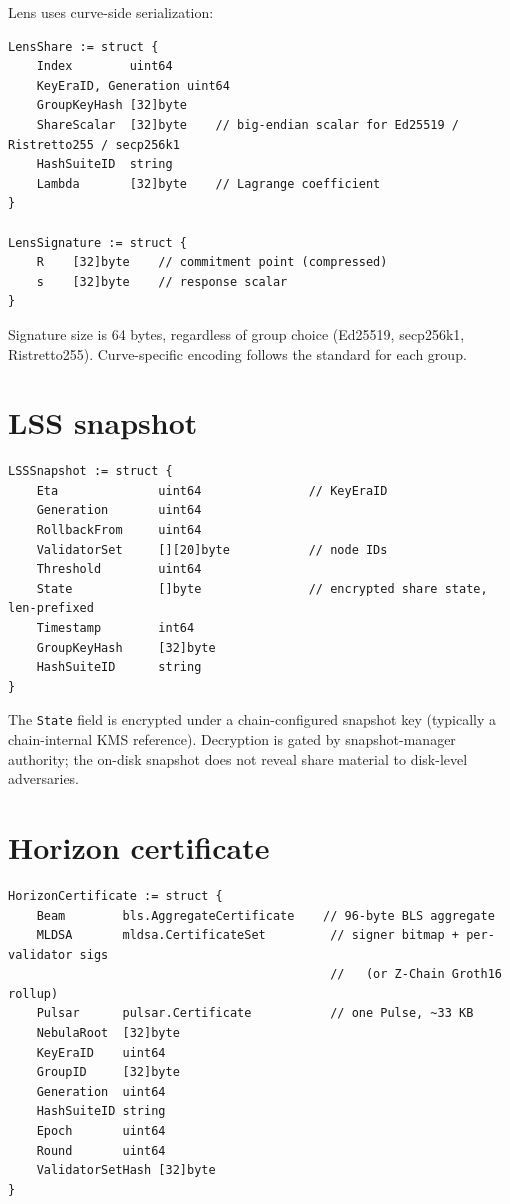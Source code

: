 \documentclass[11pt,a4paper]{article}
\begin{document}
Lens uses curve-side serialization:

\begin{lstlisting}
LensShare := struct {
    Index        uint64
    KeyEraID, Generation uint64
    GroupKeyHash [32]byte
    ShareScalar  [32]byte    // big-endian scalar for Ed25519 / Ristretto255 / secp256k1
    HashSuiteID  string
    Lambda       [32]byte    // Lagrange coefficient
}

LensSignature := struct {
    R    [32]byte    // commitment point (compressed)
    s    [32]byte    // response scalar
}
\end{lstlisting}

Signature size is 64 bytes, regardless of group choice (Ed25519, secp256k1, Ristretto255). Curve-specific encoding follows the standard for each group.

\section{LSS snapshot}

\begin{lstlisting}
LSSSnapshot := struct {
    Eta              uint64               // KeyEraID
    Generation       uint64
    RollbackFrom     uint64
    ValidatorSet     [][20]byte           // node IDs
    Threshold        uint64
    State            []byte               // encrypted share state, len-prefixed
    Timestamp        int64
    GroupKeyHash     [32]byte
    HashSuiteID      string
}
\end{lstlisting}

The \texttt{State} field is encrypted under a chain-configured snapshot key (typically a chain-internal KMS reference). Decryption is gated by snapshot-manager authority; the on-disk snapshot does not reveal share material to disk-level adversaries.

\section{Horizon certificate}

\begin{lstlisting}
HorizonCertificate := struct {
    Beam        bls.AggregateCertificate    // 96-byte BLS aggregate
    MLDSA       mldsa.CertificateSet         // signer bitmap + per-validator sigs
                                             //   (or Z-Chain Groth16 rollup)
    Pulsar      pulsar.Certificate           // one Pulse, ~33 KB
    NebulaRoot  [32]byte
    KeyEraID    uint64
    GroupID     [32]byte
    Generation  uint64
    HashSuiteID string
    Epoch       uint64
    Round       uint64
    ValidatorSetHash [32]byte
}
\end{lstlisting}
\end{document}
